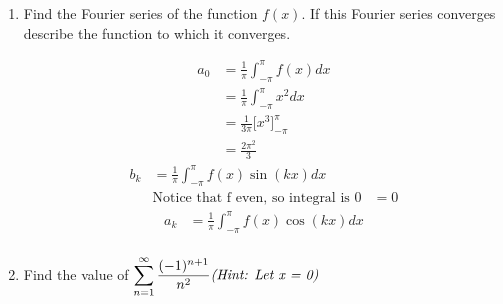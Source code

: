 \documentclass{article}
\begin{document}
\begin{enumerate}
\begin{enumerate}
\item Find the Fourier series of the function $f(x)$. If this Fourier series converges describe the function to which it converges.
\begin{multicols}{2}
    \noindent
    \begin{align*}
        a_0 &= \frac{1}{\pi} \int_{-\pi}^{\pi} f(x) dx\\
        &= \frac{1}{\pi} \int_{-\pi}^{\pi} x^2 dx\\
        &= \frac{1}{3\pi} \Big[x^3 \Big]_{-\pi}^{\pi}\\
        &= \frac{2\pi^2}{3}
    \end{align*}
    \begin{align*}
        b_k &= \frac{1}{\pi} \int_{-\pi}^{\pi}f(x)\sin(kx)dx \\
        &\text{Notice that f even, so integral is 0}
        &= 0
    \end{align*}
    \begin{align*}
        a_k &= \frac{1}{\pi} \int_{-\pi}^{\pi}f(x)\cos(kx) dx \\
    \end{align*}
\end{multicols}
\item Find the value of $\displaystyle \sum_{n=1}^\infty \frac{(-1)^{n+1}}{n^2} \text{\textit{(Hint: Let x = 0)}}$
\end{enumerate}
\end{enumerate}
\end{document}
